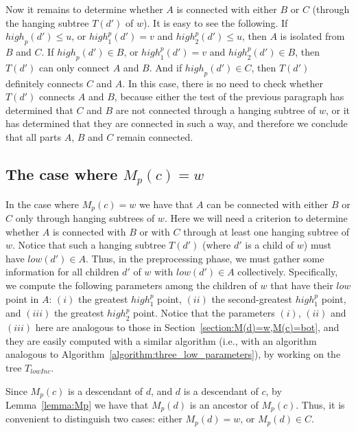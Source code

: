 \documentclass[11pt,a4paper]{article}
\begin{document}
Now it remains to determine whether $A$ is connected with either $B$ or $C$ (through the hanging subtree $T(d')$ of $w$). It is easy to see the following. If $\mathit{high}_p(d')\leq u$, or $\mathit{high}_1^p(d')=v$ and $\mathit{high}_2^p(d')\leq u$, then $A$ is isolated from $B$ and $C$. If $\mathit{high}_p(d')\in B$, or $\mathit{high}_1^p(d')=v$ and $\mathit{high}_2^p(d')\in B$, then $T(d')$ can only connect $A$ and $B$. And if $\mathit{high}_p(d')\in C$, then $T(d')$ definitely connects $C$ and $A$. In this case, there is no need to check whether $T(d')$ connects $A$ and $B$, because either the test of the previous paragraph has determined that $C$ and $B$ are not connected through a hanging subtree of $w$, or it has determined that they are connected in such a way, and therefore we conclude that all parts $A$, $B$ and $C$ remain connected. 
 
\subsection{The case where $M_p(c)=w$}
\label{section:MpC=w}
In the case where $M_p(c)=w$ we have that $A$ can be connected with either $B$ or $C$ only through hanging subtrees of $w$. Here we will need a criterion to determine whether $A$ is connected with $B$ or with $C$ through at least one hanging subtree of $w$. Notice that such a hanging subtree $T(d')$ (where $d'$ is a child of $w$) must have $\mathit{low}(d')\in A$. Thus, in the preprocessing phase, we must gather some information for all children $d'$ of $w$ with $\mathit{low}(d')\in A$ collectively. Specifically, we compute the following parameters among the children of $w$ that have their $\mathit{low}$ point in $A$: $(i)$ the greatest $\mathit{high}^p_1$ point, $(ii)$ the second-greatest $\mathit{high}^p_1$ point, and $(iii)$ the greatest $\mathit{high}^p_2$ point. Notice that the parameters $(i)$, $(ii)$ and $(iii)$ here are analogous to those in Section~\ref{section:M(d)=w,M(c)=bot}, and they are easily computed with a similar algorithm (i.e., with an algorithm analogous to Algorithm~\ref{algorithm:three_low_parameters}), by working on the tree $T_\mathit{lowInc}$.

Since $M_p(c)$ is a descendant of $d$, and $d$ is a descendant of $c$, by Lemma~\ref{lemma:Mp} we have that $M_p(d)$ is an ancestor of $M_p(c)$. Thus, it is convenient to distinguish two cases: either $M_p(d)=w$, or $M_p(d)\in C$.
\end{document}
